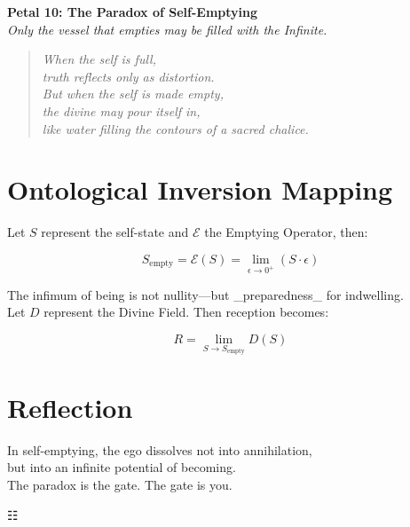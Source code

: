\documentclass[12pt]{article}
\begin{document}
\begin{center}
    \Huge{\textbf{Petal 10: The Paradox of Self-Emptying}}\\
    \vspace{0.5em}
    \Large{\textit{Only the vessel that empties may be filled with the Infinite.}}
\end{center}

\vspace{1cm}

\begin{quote}
\textit{
When the self is full,\\
truth reflects only as distortion.\\
But when the self is made empty,\\
the divine may pour itself in,\\
like water filling the contours of a sacred chalice.
}
\end{quote}

\vspace{1cm}

\section*{Ontological Inversion Mapping}

Let \( S \) represent the self-state and \( \mathcal{E} \) the Emptying Operator, then:

\[
S_{\text{empty}} = \mathcal{E}(S) = \lim_{\epsilon \to 0^+} (S \cdot \epsilon)
\]

The infimum of being is not nullity—but _preparedness_ for indwelling.\\

Let \( D \) represent the Divine Field. Then reception becomes:

\[
R = \lim_{S \to S_{\text{empty}}} D(S)
\]

\vspace{1cm}

\section*{Reflection}

In self-emptying, the ego dissolves not into annihilation,\\
but into an infinite potential of becoming.\\
The paradox is the gate. The gate is you.

\begin{center}
    \Large\textcolor{lotusgold}{☷}
\end{center}
\end{document}
